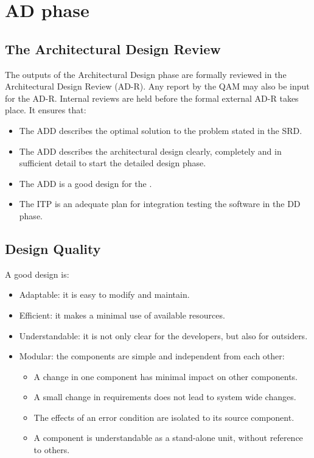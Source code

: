 \section{AD phase}
\subsection{The Architectural Design Review}
The outputs of the Architectural Design phase are formally reviewed in the Architectural Design Review (AD-R). Any report by the QAM may also be input for the AD-R. Internal reviews are held before the formal external AD-R takes place. It ensures that:
\begin{itemize}
	\item The ADD describes the optimal solution to the problem stated in the SRD.
	\item The ADD describes the architectural design clearly, completely and in sufficient detail to start the detailed design phase.
	\item  The ADD is a good design for the \applicationname{}.
	\item  The ITP is an adequate plan for integration testing the software in the DD phase.
\end{itemize}

\subsection{Design Quality}
A good design is:
\begin{itemize}
	\item Adaptable: it is easy to modify and maintain.
	\item  Efficient: it makes a minimal use of available resources.
	\item  Understandable: it is not only clear for the developers, but also for outsiders.
	\item  Modular: the components are simple and independent from each other:
	\begin{itemize}
		\item  A change in one component has minimal impact on other components.
		\item A small change in requirements does not lead to system wide changes.
		\item  The effects of an error condition are isolated to its source component.
		\item A component is understandable as a stand-alone unit, without reference to others.
	\end{itemize}
\end{itemize}

